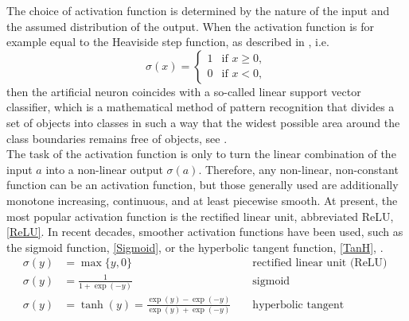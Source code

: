 The choice of activation function is determined by the nature of the input and the assumed distribution of the output. When the activation function is for example equal to the Heaviside step function, as described in \cite{Rosenblatt:1958}, i.e.
\begin{equation*}
    \sigma(x) = \begin{cases} 1 & \text{if } x \geq 0, \\ 0 & \text{if } x < 0, \end{cases}
\end{equation*}
then the artificial neuron coincides with a so-called linear support vector classifier, which is a mathematical method of pattern recognition that divides a set of objects into classes in such a way that the widest possible area around the class boundaries remains free of objects, see \cite[Chapter~7]{Bishop:2006}. \\
The task of the activation function is only to turn the linear combination of the input $a$ into a non-linear output $\sigma(a)$. Therefore, any non-linear, non-constant function can be an activation function, but those generally used are additionally monotone increasing, continuous, and at least piecewise smooth. At present, the most popular activation function is the rectified linear unit, abbreviated ReLU, \cref{ReLU}. In recent decades, smoother activation functions have been used, such as the sigmoid function, \cref{Sigmoid}, or the hyperbolic tangent function, \cref{TanH}, \cite[p.~3]{LeCunBengioHinton:2015}.
\begin{align}
    \sigma(y) &=\max \{y, 0\} & & \text{ rectified linear unit (ReLU) } \label{ReLU} \\
    \sigma(y) &=\frac{1}{1+\exp (-y)} & & \text{ sigmoid } \label{Sigmoid} \\
    \sigma(y) &=\tanh (y)=\frac{\exp (y)-\exp (-y)}{\exp (y)+\exp (-y)} & & \text{ hyperbolic tangent } \label{TanH}
\end{align}

